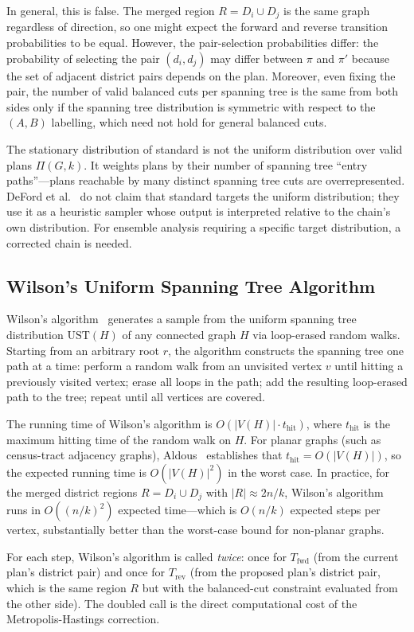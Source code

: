 In general, this is false.
The merged region $R = D_i \cup D_j$ is the same graph regardless of
direction, so one might expect the forward and reverse transition probabilities
to be equal.
However, the pair-selection probabilities differ: the probability of selecting
the pair $(d_i, d_j)$ may differ between $\pi$ and $\pi'$ because the set of
adjacent district pairs depends on the plan.
Moreover, even fixing the pair, the number of valid balanced cuts per spanning
tree is the same from both sides only if the spanning tree distribution is
symmetric with respect to the $(A, B)$ labelling, which need not hold for
general balanced cuts.

\begin{remark}
\label{rem:std-stationarity}
The stationary distribution of standard \recom{} is not the uniform
distribution over valid plans $\Pi(G,k)$.
It weights plans by their number of spanning tree ``entry paths''---plans
reachable by many distinct spanning tree cuts are overrepresented.
DeFord et al.~\citep{deford2021} do not claim that standard \recom{}
targets the uniform distribution; they use it as a heuristic sampler
whose output is interpreted relative to the chain's own distribution.
For ensemble analysis requiring a specific target distribution, a corrected
chain is needed.
\end{remark}

\subsection{Wilson's Uniform Spanning Tree Algorithm}

Wilson's algorithm~\citep{wilson1996} generates a sample from the uniform
spanning tree distribution $\mathrm{UST}(H)$ of any connected graph $H$ via
loop-erased random walks.
Starting from an arbitrary root $r$, the algorithm constructs the spanning
tree one path at a time: perform a random walk from an unvisited vertex $v$
until hitting a previously visited vertex; erase all loops in the path; add
the resulting loop-erased path to the tree; repeat until all vertices are
covered.

The running time of Wilson's algorithm is $O(|V(H)| \cdot t_{\mathrm{hit}})$,
where $t_{\mathrm{hit}}$ is the maximum hitting time of the random walk on
$H$.
For planar graphs (such as census-tract adjacency graphs), Aldous~\citep{aldous1991}
establishes that $t_{\mathrm{hit}} = O(|V(H)|)$, so the expected running time
is $O(|V(H)|^2)$ in the worst case.
In practice, for the merged district regions $R = D_i \cup D_j$ with
$|R| \approx 2n/k$, Wilson's algorithm runs in $O((n/k)^2)$ expected time---which
is $O(n/k)$ expected steps per vertex, substantially better than the worst-case
bound for non-planar graphs.

For each \fr{} step, Wilson's algorithm is called \emph{twice}: once for
$T_{\mathrm{fwd}}$ (from the current plan's district pair) and once for
$T_{\mathrm{rev}}$ (from the proposed plan's district pair, which is the
same region $R$ but with the balanced-cut constraint evaluated from the other
side).
The doubled call is the direct computational cost of the Metropolis-Hastings
correction.
